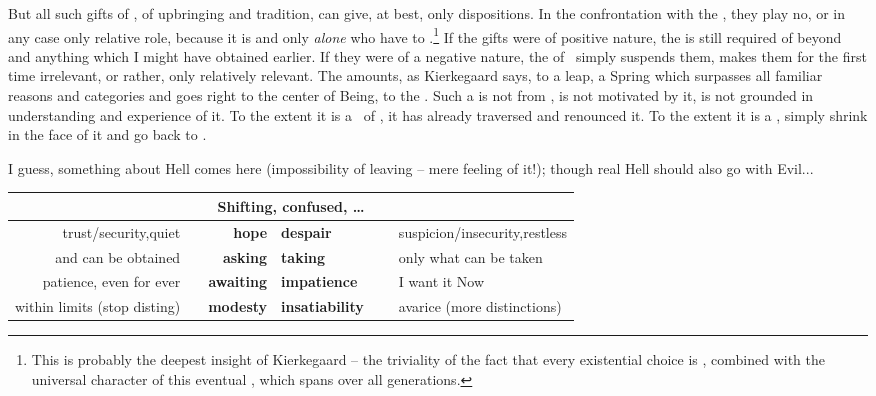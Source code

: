 \pa
But all such gifts of , of upbringing and tradition, 
can give, at best, only  dispositions.  In the 
confrontation with the \sch, they play
no, or in any case only relative role, because it is  and only
 {\em alone} who have to .\footnote{This
is probably the deepest insight of Kierkegaard -- the triviality of
the fact that every existential choice is , combined with
the universal character of this eventual , which spans over
all generations.}
If the gifts were of positive nature, the  is still
required of  beyond and  anything which I might have
obtained earlier.  If they were of a negative nature, the  of
\sch\ simply suspends them, makes them for the first time irrelevant,
or rather, only relatively relevant.  The  amounts, as
Kierkegaard says, to a leap, a Spring which surpasses all familiar
reasons and categories and goes right to the center of Being, to the
.  Such a  is not from , is
not motivated by it, is not grounded in  understanding and
experience of it.  To the extent it is a \sch\ of \yes, it has already
traversed  and renounced it.  To the extent it is a
\No,  simply shrink in the face of it and go back to .



\say
I guess, something about Hell comes here (impossibility of leaving -- mere
feeling of it!); though real Hell should also go with Evil...

\begin{tabular}{|r@{\dotfill}r@{\ \ \ --\ \ \ }l@{\dotfill}l|}
\hline
\multicolumn{4}{|c|}{Shifting, confused, \ldots} \\ \hline
trust/security,quiet    & {\bf hope}    & {\bf despair} & suspicion/insecurity,restless \\
and can be obtained     & {\bf asking}  & {\bf taking}  & only what can be taken \\
patience, even for ever & {\bf awaiting}        & {\bf impatience}      & I want it Now \\
within limits (stop disting)    &\ \ {\bf modesty}      & {\bf insatiability}\ \ \  
                      & avarice (more distinctions)\\
\hline
\end{tabular}

